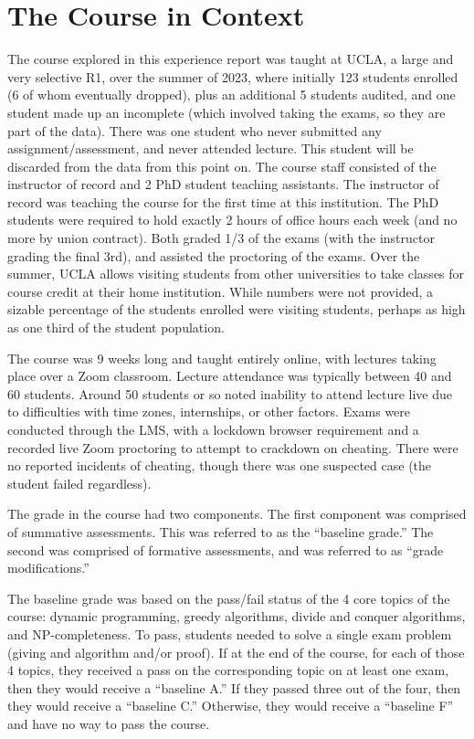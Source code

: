 \documentclass{article}
\begin{document}
\section{The Course in Context}
The course explored in this experience report was taught at UCLA, a large and very selective R1, over the summer of 2023, where initially 123 students enrolled (6 of whom eventually dropped), plus an additional 5 students audited, and one student made up an incomplete (which involved taking the exams, so they are part of the data). There was one student who never submitted any assignment/assessment, and never attended lecture. This student will be discarded from the data from this point on. The course staff consisted of the instructor of record and 2 PhD student teaching assistants. The instructor of record was teaching the course for the first time at this institution. The PhD students were required to hold exactly 2 hours of office hours each week (and no more by union contract). Both graded 1/3 of the exams (with the instructor grading the final 3rd), and assisted the proctoring of the exams. Over the summer, UCLA allows visiting students from other universities to take classes for course credit at their home institution. While numbers were not provided, a sizable percentage of the students enrolled were visiting students, perhaps as high as one third of the student population.

The course was 9 weeks long and taught entirely online, with lectures taking place over a Zoom classroom. Lecture attendance was typically between 40 and 60 students. Around 50 students or so noted inability to attend lecture live due to difficulties with time zones, internships, or other factors. Exams were conducted through the LMS, with a lockdown browser requirement and a recorded live Zoom proctoring to attempt to crackdown on cheating. There were no reported incidents of cheating, though there was one suspected case (the student failed regardless).

The grade in the course had two components. The first component was comprised of summative assessments. This was referred to as  the ``baseline grade.'' The second was comprised of formative assessments, and was referred to as ``grade modifications.''

The baseline grade was based on the pass/fail status of the 4 core topics of the course: dynamic programming, greedy algorithms, divide and conquer algorithms, and NP-completeness. To pass, students needed to solve a single exam problem (giving and algorithm and/or proof). If at the end of the course, for each of those 4 topics, they received a pass on the corresponding topic on at least one exam, then they would receive a ``baseline A.'' If they passed three out of the four, then they would receive a ``baseline C.'' Otherwise, they would receive a ``baseline F'' and have no way to pass the course.
\end{document}
